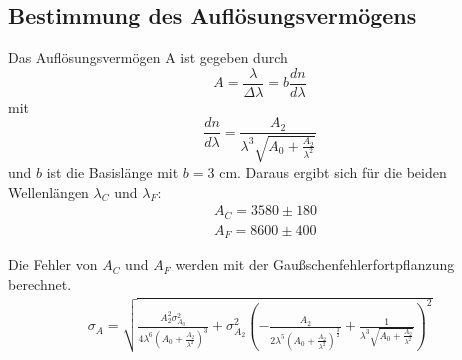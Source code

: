\subsection{Bestimmung des Auflösungsvermögens}
Das Auflösungsvermögen A ist gegeben durch
\begin{equation*}
  A = \frac{\lambda}{\Delta \lambda} = b\frac{dn}{d\lambda}
\end{equation*}
mit
\begin{equation*}
  \frac{dn}{d\lambda} = \frac{A_2}{\lambda^3\sqrt{A_0 + \frac{A_2}{\lambda^2}}}
\end{equation*}
und $b$ ist die Basislänge mit $b = 3$ cm.
Daraus ergibt sich für die beiden Wellenlängen $\lambda_C$ und $\lambda_F$:
\begin{align*}
  &A_C = 3580 \pm 180 \\
  &A_F = 8600 \pm 400
\end{align*}


Die Fehler von $A_C$ und $A_F$ werden mit der Gaußschenfehlerfortpflanzung berechnet.
\begin{align*}
  \sigma_A = \sqrt{\frac{A_2^{2} \sigma_{A_0}^{2}}{4 \lambda^{6} \left(A_0 + \frac{A_2}{\lambda^{2}}\right)^{3}}
  + \sigma_{A_2}^{2} \left(- \frac{A_2}{2 \lambda^{5} \left(A_0 + \frac{A_2}{\lambda^{2}}\right)^{\frac{3}{2}}}
  + \frac{1}{\lambda^{3} \sqrt{A_0 + \frac{A_2}{\lambda^{2}}}}\right)^{2}}
\end{align*}
